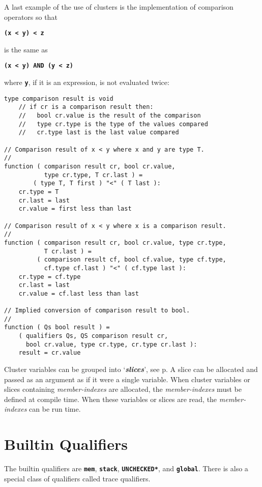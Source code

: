 \documentclass[12pt]{article}
\newcommand{\TT}[1]{{\tt \bfseries #1}}
\newcommand{\skey}[2]{{\bf \em #1#2}\index{#1}}
\newcommand{\pagref}[1]{p\pageref{#1}}
\newenvironment{indpar}[1][0.3in]%
	{\begin{list}{}%
		     {\setlength{\itemsep}{0in}%
		      \setlength{\topsep}{0in}%
		      \setlength{\parsep}{1ex}%
		      \setlength{\labelwidth}{#1}%
		      \setlength{\leftmargin}{#1}%
		      \addtolength{\leftmargin}{\labelsep}}%
	 \item}%
	{\end{list}}
\begin{document}
A last example of the use of clusters is the implementation of
comparison operators so that
\begin{center}
\TT{(x~<~y)~<~z}
\end{center}
is the same as
\begin{center}
\TT{(x~<~y) AND (y~<~z)}
\end{center}
where \TT{y}, if it is an expression,
is not evaluated twice:\label{COMPARISON-RESULTS}
\begin{indpar}\begin{verbatim}
type comparison result is void
    // if cr is a comparison result then:
    //   bool cr.value is the result of the comparison
    //   type cr.type is the type of the values compared
    //   cr.type last is the last value compared

// Comparison result of x < y where x and y are type T.
//
function ( comparison result cr, bool cr.value,
           type cr.type, T cr.last ) =
        ( type T, T first ) "<" ( T last ):
    cr.type = T
    cr.last = last
    cr.value = first less than last

// Comparison result of x < y where x is a comparison result.
//
function ( comparison result cr, bool cr.value, type cr.type,
           T cr.last ) =
         ( comparison result cf, bool cf.value, type cf.type,
           cf.type cf.last ) "<" ( cf.type last ):
    cr.type = cf.type
    cr.last = last
    cr.value = cf.last less than last

// Implied conversion of comparison result to bool.
//
function ( Qs bool result ) =
    ( qualifiers Qs, QS comparison result cr,
      bool cr.value, type cr.type, cr.type cr.last ):
    result = cr.value
\end{verbatim}\end{indpar}

Cluster variables can be grouped into `\skey{slice}s', see
\pagref{SLICE}.  A slice can be allocated and passed
as an argument as if it were a single variable.  When cluster
variables or slices containing {\em member-indexes} are allocated,
the {\em member-indexes} must be defined at compile time.
When these variables or slices are read, the
{\em member-indexes} can be run time.

\section{Builtin Qualifiers}
\label{BUILTIN-QUALIFIERS}

The builtin qualifiers are \TT{mem}, \TT{stack}, \TT{*UNCHECKED*},
and \TT{global}.
There is also a special class of qualifiers called trace qualifiers.
\end{document}
